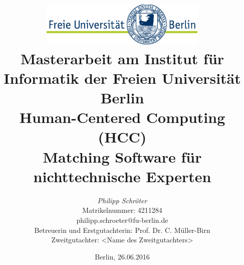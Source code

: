 %
\begin{titlepage}

\title{\includegraphics[width=0.6\textwidth]{pics/FU_logo.pdf}\\
{\small Masterarbeit am Institut für Informatik der Freien Universität Berlin}\\
{\small Human-Centered Computing (HCC)}\\
[6ex]
{\LARGEOntologie Matching Software für nichttechnische Experten}}

\author{
{\emph{\normalsize Philipp Schröter}}\\
{\normalsize Matrikelnummer: 4211284}\\
{\normalsize philipp.schroeter@fu-berlin.de}\\ 
[18ex]   
{\normalsize Betreuerin und Erstgutachterin: Prof. Dr. C. Müller-Birn} \\
{\normalsize Zweitgutachter: <Name des Zweitgutachters>}}
\vspace{6ex}
\date{\normalsize Berlin, 26.06.2016}
 
\maketitle  

\end{titlepage}